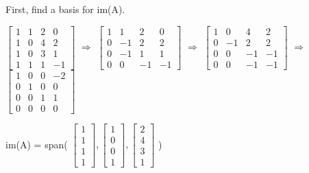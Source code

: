     \begin{tbox}
        First, find a basis for im(A).

        \hspace{0.5cm}
        \scriptsize
        $\begin{bmatrix}
            1 & 1 & 2 & 0 \\
            1 & 0 & 4 & 2 \\
            1 & 0 & 3 & 1 \\
            1 & 1 & 1 & -1
        \end{bmatrix}$
        $\Rightarrow$
        $\begin{bmatrix}
            1 & 1 & 2 & 0 \\
            0 & -1 & 2 & 2 \\
            0 & -1 & 1 & 1 \\
            0 & 0 & -1 & -1
        \end{bmatrix}$
        $\Rightarrow$
        $\begin{bmatrix}
            1 & 0 & 4 & 2 \\
            0 & -1 & 2 & 2 \\
            0 & 0 & -1 & -1 \\
            0 & 0 & -1 & -1
        \end{bmatrix}$
        $\Rightarrow$
        $\begin{bmatrix}
            1 & 0 & 0 & -2 \\
            0 & 1 & 0 & 0 \\
            0 & 0 & 1 & 1 \\
            0 & 0 & 0 & 0
        \end{bmatrix}$
        \normalsize

        \hspace{0.5cm}
        im(A) = span(
        \scriptsize
        $\begin{bmatrix}
            1 \\
            1 \\
            1 \\
            1
        \end{bmatrix},
        \begin{bmatrix}
            1 \\
            0 \\
            0 \\
            1
        \end{bmatrix},
        \begin{bmatrix}
            2 \\
            4 \\
            3 \\
            1
        \end{bmatrix}$
        \normalsize)


\end{tbox}
